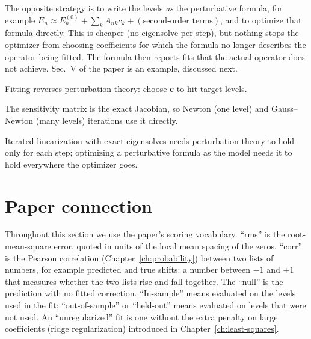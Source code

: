 The opposite strategy is to write the levels \emph{as} the perturbative formula, for example $E_n\approx E_n^{(0)}+\sum_kA_{nk}c_k+(\text{second-order terms})$, and to optimize that formula directly. This is cheaper (no eigensolve per step), but nothing stops the optimizer from choosing coefficients for which the formula no longer describes the operator being fitted. The formula then reports fits that the actual operator does not achieve. Sec.~V of the paper is an example, discussed next.

\begin{keyideas}
\item Fitting reverses perturbation theory: choose $\bm c$ to hit target levels.
\item The sensitivity matrix is the exact Jacobian, so Newton (one level) and Gauss--Newton (many levels) iterations use it directly.
\item Iterated linearization with exact eigensolves needs perturbation theory to hold only for each step; optimizing a perturbative formula as the model needs it to hold everywhere the optimizer goes.
\end{keyideas}

\section{Paper connection}\label{sec:perturbation-paper}

Throughout this section we use the paper's scoring vocabulary. ``rms'' is the root-mean-square error, quoted in units of the local mean spacing of the zeros. ``corr'' is the Pearson correlation (Chapter~\ref{ch:probability}) between two lists of numbers, for example predicted and true shifts: a number between $-1$ and $+1$ that measures whether the two lists rise and fall together. The ``null'' is the prediction with no fitted correction. ``In-sample'' means evaluated on the levels used in the fit; ``out-of-sample'' or ``held-out'' means evaluated on levels that were not used. An ``unregularized'' fit is one without the extra penalty on large coefficients (ridge regularization) introduced in Chapter~\ref{ch:least-squares}.


